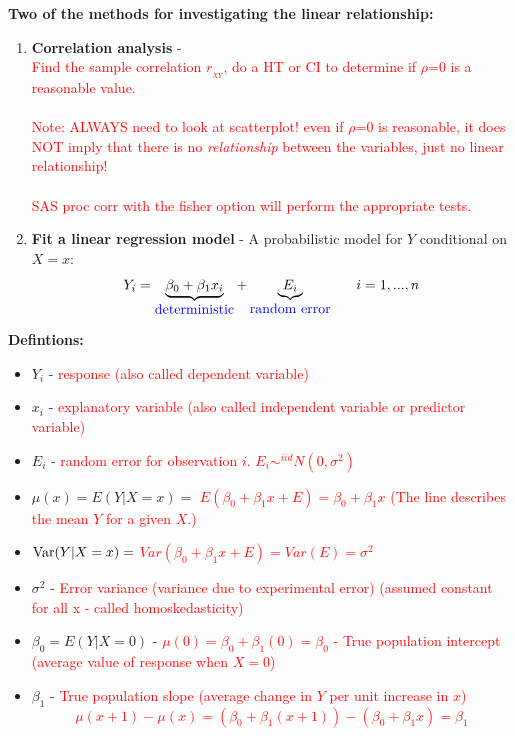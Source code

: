 \textbf{Two of the methods for investigating the linear relationship:}
\begin{enumerate}
\item \textbf{Correlation analysis} -  	\\
\textcolor{red}{Find the sample correlation $r_{_{XY}}$, do a HT or CI to determine if $\rho$=0 is a reasonable value.  \\~\\
	Note: ALWAYS need to look at scatterplot! even if $\rho$=0 is reasonable, it does NOT imply that there is no \textit{relationship} between the variables, just no linear relationship! \\~\\
	SAS proc corr with the fisher option will perform the appropriate tests.}
	
\newpage

\item \textbf{Fit a linear regression model} - A probabilistic model for $Y$ conditional on $X=x$:
		$$ Y_i = \underbrace{\beta_0 + \beta_1 x_i}_{\mbox{\textcolor{blue}{deterministic}}} + \underbrace{E_i}_{\mbox{\textcolor{blue}{random error}}}~~~~~i=1,...,n$$
\end{enumerate}
\textbf{Defintions:}
\begin{itemize}
\item $Y_i$ - %
\textcolor{red}{response (also called dependent variable)}
\item $x_i$ - %
\textcolor{red}{explanatory variable (also called independent variable or predictor variable)}
\item $E_i$ - %
\textcolor{red}{random error for observation $i$.  $E_i\sim^{iid}N(0,\sigma^2)$}
\item $\mu(x)=E(Y|X=x)=$%
\textcolor{red}{$E(\beta_0+\beta_1x+E)=\beta_0 + \beta_1 x$ (The line describes the mean $Y$ for a given $X$.)}
\item $\mbox{Var}(Y|X=x)=$ %
\textcolor{red}{$Var(\beta_0+\beta_1x+E)=Var(E)=\sigma^2$}
\item $\sigma^2$ - %
\textcolor{red}{Error variance (variance due to experimental error) (assumed constant for all x - called homoskedasticity)}
\item $\beta_0=E(Y|X=0)$ - %
\textcolor{red}{$\mu(0)=\beta_0+\beta_1(0)=\beta_0$ - True population intercept (average value of response when $X=0$)}
\item $\beta_1$ - %
\textcolor{red}{True population slope (average change in $Y$ per unit increase in $x$)
$$\mu(x+1)-\mu(x)=\left(\beta_0+\beta_1(x+1)\right)-\left(\beta_0+\beta_1x\right)=\beta_1$$}
\end{itemize}

